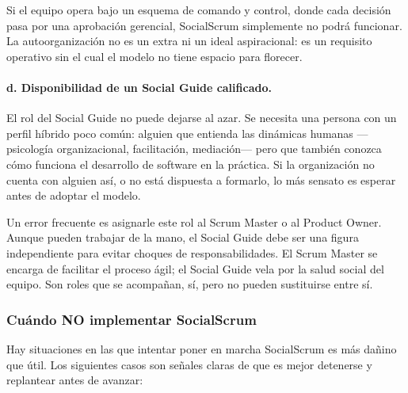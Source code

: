 Si el equipo opera bajo un esquema de comando y control, donde cada decisión pasa por una aprobación gerencial, SocialScrum simplemente no podrá funcionar. La autoorganización no es un extra ni un ideal aspiracional: es un requisito operativo sin el cual el modelo no tiene espacio para florecer.

\paragraph{d. Disponibilidad de un Social Guide calificado.}

El rol del Social Guide no puede dejarse al azar. Se necesita una persona con un perfil híbrido poco común: alguien que entienda las dinámicas humanas —psicología organizacional, facilitación, mediación— pero que también conozca cómo funciona el desarrollo de software en la práctica. Si la organización no cuenta con alguien así, o no está dispuesta a formarlo, lo más sensato es esperar antes de adoptar el modelo.

Un error frecuente es asignarle este rol al Scrum Master o al Product Owner. Aunque pueden trabajar de la mano, el Social Guide debe ser una figura independiente para evitar choques de responsabilidades. El Scrum Master se encarga de facilitar el proceso ágil; el Social Guide vela por la salud social del equipo. Son roles que se acompañan, sí, pero no pueden sustituirse entre sí.

\subsubsection{Cuándo \textbf{NO} implementar SocialScrum}

Hay situaciones en las que intentar poner en marcha SocialScrum es más dañino que útil. Los siguientes casos son señales claras de que es mejor detenerse y replantear antes de avanzar:

